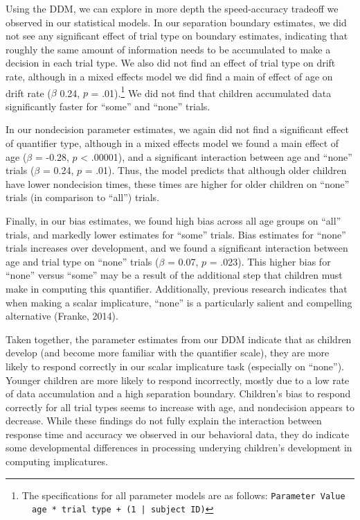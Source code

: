 \documentclass[10pt, letterpaper]{article}
\begin{document}
Using the DDM, we can explore in more depth the speed-accuracy tradeoff
we observed in our statistical models. In our separation boundary
estimates, we did not see any significant effect of trial type on
boundary estimates, indicating that roughly the same amount of
information needs to be accumulated to make a decision in each trial
type. We also did not find an effect of trial type on drift rate,
although in a mixed effects model we did find a main of effect of age on
drift rate (\(\beta\) 0.24, \(p\) =
.01).\footnote{The specifications for all parameter models are as follows: \texttt{Parameter Value ~ age * trial type + (1 | subject ID)}}
We did not find that children accumulated data significantly faster for
``some'' and ``none'' trials.

In our nondecision parameter estimates, we again did not find a
significant effect of quantifier type, although in a mixed effects model
we found a main effect of age (\(\beta\) = -0.28, \(p\) \textless{}
.00001), and a significant interaction between age and ``none'' trials
(\(\beta\) = 0.24, \(p\) = .01). Thus, the model predicts that although
older children have lower nondecision times, these times are higher for
older children on ``none'' trials (in comparison to ``all'') trials.

Finally, in our bias estimates, we found high bias across all age groups
on ``all'' trials, and markedly lower estimates for ``some'' trials.
Bias estimates for ``none'' trials increases over development, and we
found a significant interaction between age and trial type on ``none''
trials (\(\beta\) = 0.07, \(p\) = .023). This higher bias for ``none''
versus ``some'' may be a result of the additional step that children
must make in computing this quantifier. Additionally, previous research
indicates that when making a scalar implicature, ``none'' is a
particularly salient and compelling alternative (Franke, 2014).

Taken together, the parameter estimates from our DDM indicate that as
children develop (and become more familiar with the quantifier scale),
they are more likely to respond correctly in our scalar implicature task
(especially on ``none''). Younger children are more likely to respond
incorrectly, mostly due to a low rate of data accumulation and a high
separation boundary. Children's bias to respond correctly for all trial
types seems to increase with age, and nondecision appears to decrease.
While these findings do not fully explain the interaction between
response time and accuracy we observed in our behavioral data, they do
indicate some developmental differences in processing underying
children's development in computing implicatures.
\end{document}
